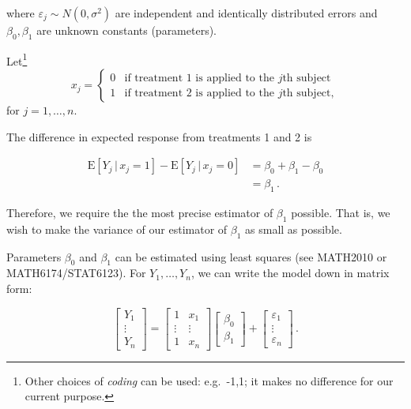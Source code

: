 \documentclass[
]{book}
\theoremstyle{definition}
\theoremstyle{definition}
\theoremstyle{definition}
\theoremstyle{definition}
\theoremstyle{remark}
\begin{document}
where \(\varepsilon_j\sim N(0,\sigma^{2})\) are independent and identically distributed errors and \(\beta_{0}, \beta_{1}\) are unknown constants (parameters).

Let\footnote{Other choices of \emph{coding} can be used: e.g.~-1,1; it makes no difference for our current purpose.}
\begin{equation}
x_{j}=\left\{\begin{array}{cl}
0&\textrm{if treatment 1 is applied to the $j$th subject}\\
1&\textrm{if treatment 2 is applied to the $j$th subject}\nonumber ,
\end{array}
\right.
\end{equation}
for \(j=1,\dots,n\).

The difference in expected response from treatments 1 and 2 is

\begin{equation}
\begin{split}
\textrm{E}[Y_j\, |\, x_j = 1] - \textrm{E}[Y_j\, |\, x_j = 0] & = \beta_{0}+\beta_{1}-\beta_{0} \\
& = \beta_{1}\,.
\end{split}
\label{eq:ex-ex-response}
\end{equation}

Therefore, we require the the most precise estimator of \(\beta_{1}\) possible. That is, we wish to make the variance of our estimator of \(\beta_1\) as small as possible.

Parameters \(\beta_{0}\) and \(\beta_{1}\) can be estimated using least squares (see MATH2010 or MATH6174/STAT6123). For \(Y_1,\dots,Y_n\), we can write the model down in matrix form:

\begin{equation*}
\left[ \begin{array}{c}
Y_1\\
\vdots\\
Y_n\end{array}\right]
=\left[ \begin{array}{cc}
1&x_{1}\\
\vdots&\vdots\\
1&x_{n}\end{array}\right]
\left[ \begin{array}{c}
\beta_{0}\\
\beta_{1}\end{array}\right]
+\left[ \begin{array}{c}
\varepsilon_{1}\\
\vdots\\
\varepsilon_{n}\end{array}\right]\,.
\end{equation*}
\end{document}
